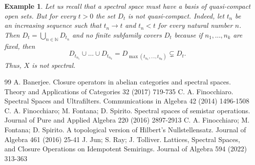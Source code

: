 \documentclass[10pt,a4paper]{amsart}
\newtheorem{example}[theorem]{Example}
\begin{document}
\begin{example}
    Let us recall that a spectral space must have a basis of quasi-compact open sets. But for every $t > 0$ the set $D_t$ is not quasi-compact. Indeed, let $t_n$ be an increasing sequence such that $t_n \rightarrow t$ and $t_n < t$ for every natural number $n$. Then $D_t = \bigcup_{n \in \mathbb{N}} D_{t_n}$ and no finite subfamily covers $D_t$ because if $n_1, \ldots, n_k$ are fixed, then 
    \begin{equation*}
        D_{t_{n_1}} \cup \ldots \cup D_{t_{n_k}} = D_{\max(t_{n_1}, \ldots, t_{n_k})} \subsetneq D_t. 
    \end{equation*}
    Thus, $X$ is not spectral. 
\end{example}

\begin{thebibliography}{99}
 A. Banerjee. Closure operators in abelian categories and spectral spaces. Theory and Applications of Categories 32 (2017) 719-735
 C. A. Finocchiaro. Spectral Spaces and Ultrafilters. Communications in Algebra 42 (2014) 1496-1508
 C. A. Finocchiaro; M. Fontana; D. Spirito. Spectral spaces of semistar operations. Journal of Pure and Applied Algebra 220 (2016) 2897-2913
 C. A. Finocchiaro; M. Fontana; D. Spirito. A topological version of {H}ilbert's {N}ullstellensatz. Journal of Algebra 461 (2016) 25-41
 J. Jun; S. Ray; J. Tolliver. Lattices, Spectral Spaces, and Closure Operations on Idempotent Semirings. Journal of Algebra 594 (2022) 313-363
\end{thebibliography}
\end{document}
